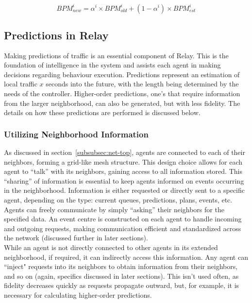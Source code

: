 \documentclass{report}
\begin{document}
\begin{equation}
    BPM_{new}^{i} = \alpha^{i} \times BPM_{old}^{i} + (1 - \alpha^{i}) \times BPM_{est}^{i}
    \label{eqn:BPM-update}
\end{equation}

\subsection{Predictions in Relay}
\label{sec:prediction_in_relay}

Making predictions of traffic is an essential component of Relay. 
This is the foundation of intelligence in the system and assists each agent in making decisions regarding behaviour execution. 
Predictions represent an estimation of local traffic $x$ seconds into the future, with the length being determined by the needs of the controller. 
Higher-order predictions, one’s that require information from the larger neighborhood, can also be generated, but with less fidelity. 
The details on how these predictions are performed is discussed below.

\subsubsection{Utilizing Neighborhood Information}
As discussed in section~\ref{subsubsec:net-top}, agents are connected to each of their neighbors, forming a grid-like mesh structure. 
This design choice allows for each agent to ``talk” with its neighbors, gaining access to all information stored. 
This ``sharing” of information is essential to keep agents informed on events occurring in the neighborhood.
Information is either requested or directly sent to a specific agent, depending on the type: current queues, predictions, plans, events, etc.
 Agents can freely communicate by simply ``asking” their neighbors for the specified data. 
An event centre is constructed on each agent to handle incoming and outgoing requests, making communication efficient and standardized across the network (discussed further in later sections). \\

	While an agent is not directly connected to other agents in its extended neighborhood, if required, it can indirectly access this information. 
Any agent can ``inject" requests into its neighbors to obtain information from their neighbors, and so on (again, specifics discussed in later sections). 
This isn’t used often, as fidelity decreases quickly as requests propagate outward, but, for example, it is necessary for calculating higher-order predictions. \\
\end{document}
